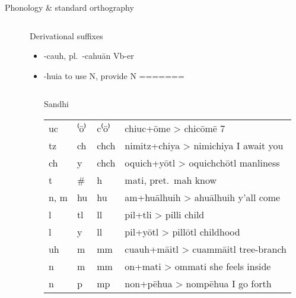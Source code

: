 \documentclass[12pt]{beamer}
\newcommand{\nah}[1]{\textcolor{nahgrn}{#1}}
\newcommand{\trs}[1]{\textcolor{nahblu}{#1}}
\begin{document}
\begin{frame}
\begin{columns}[t]
\begin{column}{.22\linewidth}
\begin{block}{Phonology \& standard orthography}
\begin{threeparttable}
\begin{tablenotes}
\begin{frame}
\begin{columns}[t]
\begin{column}{.25\linewidth}
    \end{column}
    \begin{column}{.22\linewidth}
      \begin{block}{Derivational suffixes}
        \begin{threeparttable}
          \vspace{-1.5ex}
          \begin{multicols}{2}
            \begin{itemize}
            \item \nah{-cauh}, pl.~\nah{-cahuān}  \trs{Vb-er}
            \item \nah{-huia} \trs{to use N, provide N}
=======
    \begin{column}{.26\linewidth}
      \begin{block}{Sandhi}
        \begin{threeparttable}
          \begin{tabular}{l@{+ }l@{> }ll}
            \nah{uc}   & \nah{⁽ō⁾} & \nah{c⁽ō⁾}            & \nah{chiuc}+\nah{ōme} > \nah{chicōmē} \trs{7}                   \\
            \nah{tz}   & \nah{ch}  & \nah{chch}\tnote{1}   & \nah{nimitz}+\nah{chiya} > \nah{nimichiya} \trs{I await you}    \\
            \nah{ch}   & \nah{y}   & \nah{chch}\tnote{1}   & \nah{oquich}+\nah{yōtl} > \nah{oquichchōtl} \trs{manliness}     \\
            \nah{t}    & \nah{\#}  & \nah{h}               & \nah{mati}, pret.~\nah{mah} \trs{know}                          \\
            \nah{n, m} & \nah{hu}  & \nah{hu}              & \nah{am}+\nah{huālhuih} > \nah{ahuālhuih} \trs{y'all come}      \\
            \nah{l}    & \nah{tl}  & \nah{ll}              & \nah{pil}+\nah{tli} > \nah{pilli} \trs{child}                   \\
            \nah{l}    & \nah{y}   & \nah{ll}              & \nah{pil}+\nah{yōtl} > \nah{pillōtl} \trs{childhood}            \\
            \nah{uh}   & \nah{m}   & \nah{mm}              & \nah{cuauh}+\nah{māitl} > \nah{cuammāitl} \trs{tree-branch}     \\
            \nah{n}    & \nah{m}   & \nah{mm}              & \nah{on}+\nah{mati} > \nah{ommati} \trs{she feels inside}       \\
            \nah{n}    & \nah{p}   & \nah{mp}              & \nah{non}+\nah{pēhua} > \nah{nompēhua} \trs{I go forth}         \\

\end{tabular}
\end{threeparttable}
\end{block}
\end{column}
\end{itemize}
\end{multicols}
\end{threeparttable}
\end{block}
\end{column}
\end{columns}
\end{frame}
\end{tablenotes}
\end{threeparttable}
\end{block}
\end{column}
\end{columns}
\end{frame}
\end{document}

